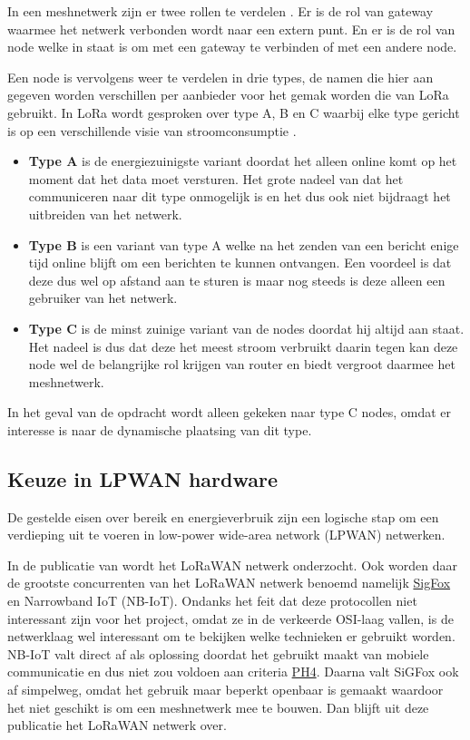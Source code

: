 \documentclass[a4paper, 11pt, oneside]{report}
\begin{document}
In een meshnetwerk zijn er twee rollen te verdelen \cite{compNRF}.
Er is de rol van gateway waarmee het netwerk verbonden wordt naar een extern punt. 
En er is de rol van node welke in staat is om met een gateway te verbinden of met een andere node.

Een node is vervolgens weer te verdelen in drie types, de namen die hier aan gegeven worden verschillen per aanbieder voor het gemak worden die van LoRa gebruikt.
In LoRa wordt gesproken over type A, B en C waarbij elke type gericht is op een verschillende visie van stroomconsumptie \cite{LoraLimit}.

\begin{itemize}
	\item \textbf{Type A} is de energiezuinigste variant doordat het alleen online komt op het moment dat het data moet versturen.
Het grote nadeel van dat het communiceren naar dit type onmogelijk is en het dus ook niet bijdraagt het uitbreiden van het netwerk.
	\item \textbf{Type B} is een variant van type A welke na het zenden van een bericht enige tijd online blijft om een berichten te kunnen ontvangen. 
Een voordeel is dat deze dus wel op afstand aan te sturen is maar nog steeds is deze alleen een gebruiker van het netwerk.
	\item \textbf{Type C} is de minst zuinige variant van de nodes doordat hij altijd aan staat.
Het nadeel is dus dat deze het meest stroom verbruikt daarin tegen kan deze node wel de belangrijke rol krijgen van router en biedt vergroot daarmee het meshnetwerk.
\end{itemize}

In het geval van de opdracht wordt alleen gekeken naar type C nodes, omdat er interesse is naar de dynamische plaatsing van dit type.




\subsection{Keuze in LPWAN hardware}
De gestelde eisen over bereik en energieverbruik zijn een logische stap om een verdieping uit te voeren in low-power wide-area network (LPWAN) netwerken. 

In de publicatie van \cite{LoraConnect} wordt het LoRaWAN netwerk onderzocht.
Ook worden daar de grootste concurrenten van het LoRaWAN netwerk benoemd namelijk \href{https://www.sigfox.com/en}{SigFox} en Narrowband IoT (NB-IoT).
Ondanks het feit dat deze protocollen niet interessant zijn voor het project, omdat ze in de verkeerde OSI-laag vallen, is de netwerklaag wel interessant om te bekijken welke technieken er gebruikt worden.
NB-IoT valt direct af als oplossing doordat het gebruikt maakt van mobiele communicatie en dus niet zou voldoen aan criteria \hyperlink{ph4}{PH4}.
Daarna valt SiGFox ook af simpelweg, omdat het gebruik maar beperkt openbaar is gemaakt waardoor het niet geschikt is om een meshnetwerk mee te bouwen. 
Dan blijft uit deze publicatie het LoRaWAN netwerk over. 
\end{document}
